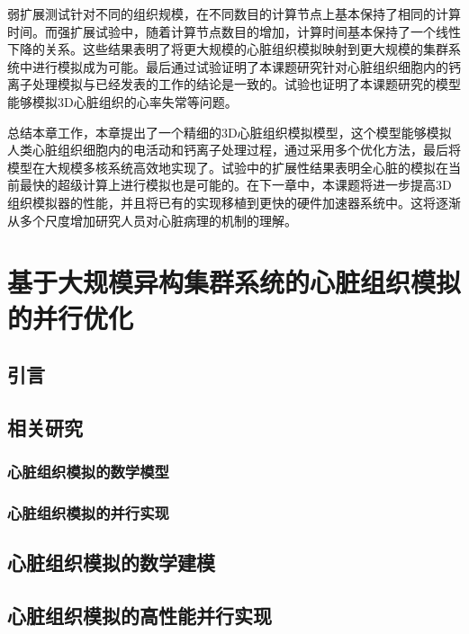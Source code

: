 弱扩展测试针对不同的组织规模，在不同数目的计算节点上基本保持了相同的计算时间。而强扩展试验中，随着计算节点数目的增加，计算时间基本保持了一个线性下降的关系。这些结果表明了将更大规模的心脏组织模拟映射到更大规模的集群系统中进行模拟成为可能。最后通过试验证明了本课题研究针对心脏组织细胞内的钙离子处理模拟与已经发表的工作的结论是一致的。试验也证明了本课题研究的模型能够模拟3D心脏组织的心率失常等问题。

总结本章工作，本章提出了一个精细的3D心脏组织模拟模型，这个模型能够模拟人类心脏组织细胞内的电活动和钙离子处理过程，通过采用多个优化方法，最后将模型在大规模多核系统高效地实现了。试验中的扩展性结果表明全心脏的模拟在当前最快的超级计算上进行模拟也是可能的。在下一章中，本课题将进一步提高3D组织模拟器的性能，并且将已有的实现移植到更快的硬件加速器系统中。这将逐渐从多个尺度增加研究人员对心脏病理的机制的理解。





\chapter{基于大规模异构集群系统的心脏组织模拟的并行优化}
\label{chapbmvc1}

\section{引言}




\section{相关研究}
\subsection{心脏组织模拟的数学模型}



\subsection{心脏组织模拟的并行实现}


\section{心脏组织模拟的数学建模}


\section{心脏组织模拟的高性能并行实现}

